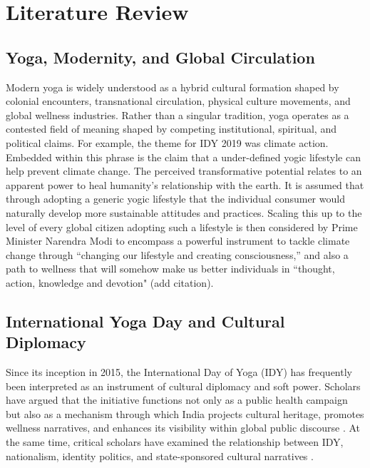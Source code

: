 \documentclass[11pt]{article}
\begin{document}
\section{Literature Review}



\subsection{Yoga, Modernity, and Global Circulation}



Modern yoga is widely understood as a hybrid cultural formation shaped by colonial encounters, transnational
circulation, physical culture movements, and global wellness industries. Rather than a singular tradition, yoga operates
as a contested field of meaning shaped by competing institutional, spiritual, and political claims. For example, the
theme for IDY 2019 was climate action. Embedded within this phrase is the claim that a under-defined yogic lifestyle can
help prevent climate change. The perceived transformative potential relates to an apparent power to heal humanity’s
relationship with the earth. It is assumed that through adopting a generic yogic lifestyle that the individual consumer
would naturally develop more sustainable attitudes and practices. Scaling this up to the level of every global citizen
adopting such a lifestyle is then considered by Prime Minister Narendra Modi to encompass a powerful instrument to
tackle climate change through “changing our lifestyle and creating consciousness,” and also a path to wellness that will
somehow make us better individuals in “thought, action, knowledge and devotion" (add citation).


\subsection{International Yoga Day and Cultural Diplomacy}



Since its inception in 2015, the International Day of Yoga (IDY) has frequently been interpreted as an instrument of
cultural diplomacy and soft power. Scholars have argued that the initiative functions not only as a public health
campaign but also as a mechanism through which India projects cultural heritage, promotes wellness narratives, and
enhances its visibility within global public discourse \citep{softpower2020, advocacy2016}. At the same time, critical
scholars have examined the relationship between IDY, nationalism, identity politics, and state-sponsored cultural
narratives \citep{choreographing2020, unintended2018}.
\end{document}
